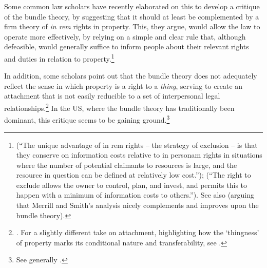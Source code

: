 
Some common law scholars have recently elaborated on this to develop a critique of the bundle theory, by suggesting that it should at least be complemented by a firm theory of {\it in rem} rights in property. This, they argue, would allow the law to operate more effectively, by relying on a simple and clear rule that, although defeasible, would generally suffice to inform people about their relevant rights and duties in relation to property.\footnote{\cite[793]{merrill01b} (``The unique advantage of in rem rights -- the strategy of exclusion -- is that they conserve on information costs relative to in personam rights in situations where the number of potential claimants to resources is large, and the resource in question can be defined at relatively low cost.''); \cite[389]{merrill01} (``The right to exclude allows the owner to control, plan, and invest, and permits this to happen with a minimum of information costs to others.''). See also \cite{ellickson11} (arguing that Merrill and Smith's analysis nicely complements and improves upon the bundle theory).} 

In addition, some scholars point out that the bundle theory does not adequately reflect the sense in which property is a right to a {\it thing}, serving to create an attachment that is not easily reducible to a set of interpersonal legal relationships.\footnote{\cite[1862]{merrill07}. For a slightly different take on attachment, highlighting how the `thingness' of property marks its conditional nature and transferability, see \cite[799-818]{penner96}.} In the US, where the bundle theory has traditionally been dominant, this critique seems to be gaining ground.\footnote{See generally \cite{foster10}.}

